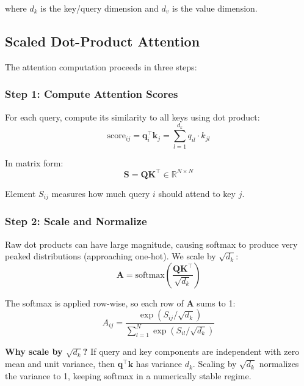 where $d_k$ is the key/query dimension and $d_v$ is the value dimension.

\subsection{Scaled Dot-Product Attention}

The attention computation proceeds in three steps:

\subsubsection{Step 1: Compute Attention Scores}

For each query, compute its similarity to all keys using dot product:
\begin{equation}
\text{score}_{ij} = \mathbf{q}_i^\top \mathbf{k}_j = \sum_{l=1}^{d_k} q_{il} \cdot k_{jl}
\label{eq:attention_score}
\end{equation}

In matrix form:
\begin{equation}
\mathbf{S} = \mathbf{Q} \mathbf{K}^\top \in \mathbb{R}^{N \times N}
\label{eq:attention_scores_matrix}
\end{equation}

Element $S_{ij}$ measures how much query $i$ should attend to key $j$.

\subsubsection{Step 2: Scale and Normalize}

Raw dot products can have large magnitude, causing softmax to produce very peaked distributions (approaching one-hot). We scale by $\sqrt{d_k}$:
\begin{equation}
\mathbf{A} = \text{softmax}\left(\frac{\mathbf{Q} \mathbf{K}^\top}{\sqrt{d_k}}\right)
\label{eq:attention_weights}
\end{equation}

The softmax is applied row-wise, so each row of $\mathbf{A}$ sums to 1:
\begin{equation}
A_{ij} = \frac{\exp(S_{ij} / \sqrt{d_k})}{\sum_{l=1}^{N} \exp(S_{il} / \sqrt{d_k})}
\label{eq:softmax_attention}
\end{equation}

\textbf{Why scale by $\sqrt{d_k}$?} If query and key components are independent with zero mean and unit variance, then $\mathbf{q}^\top \mathbf{k}$ has variance $d_k$. Scaling by $\sqrt{d_k}$ normalizes the variance to 1, keeping softmax in a numerically stable regime.

